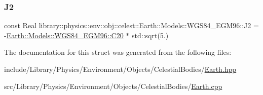 \mbox{\label{structlibrary_1_1physics_1_1env_1_1obj_1_1celest_1_1_earth_1_1_models_1_1_w_g_s84___e_g_m96_afd5252f13403c428f68256ad7719fc8e}} 
\subsubsection{\texorpdfstring{J2}{J2}}
{\footnotesize\ttfamily const Real library\+::physics\+::env\+::obj\+::celest\+::\+Earth\+::\+Models\+::\+W\+G\+S84\+\_\+\+E\+G\+M96\+::\+J2 = -\/\hyperlink{structlibrary_1_1physics_1_1env_1_1obj_1_1celest_1_1_earth_1_1_models_1_1_w_g_s84___e_g_m96_afea460be3fb35c86345c600d09f71059}{Earth\+::\+Models\+::\+W\+G\+S84\+\_\+\+E\+G\+M96\+::\+C20} $\ast$ std\+::sqrt(5.)\hspace{0.3cm}{\ttfamily [static]}}



The documentation for this struct was generated from the following files\+:\begin{DoxyCompactItemize}
\item 
include/\+Library/\+Physics/\+Environment/\+Objects/\+Celestial\+Bodies/\hyperlink{_earth_8hpp}{Earth.\+hpp}\item 
src/\+Library/\+Physics/\+Environment/\+Objects/\+Celestial\+Bodies/\hyperlink{_earth_8cpp}{Earth.\+cpp}\end{DoxyCompactItemize}
